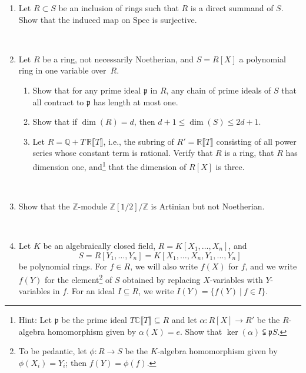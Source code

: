 \documentclass[12pt]{amsart}
\newcommand{\Q}{\mathbb{Q}}
\newcommand{\Z}{\mathbb{Z}}
\newcommand{\R}{\mathbb{R}}
\newcommand{\C}{\mathbb{C}}
\newcommand{\p}{\mathfrak{p}}
\newcommand{\Spec}{\mathrm{Spec}}
\begin{document}
\begin{enumerate}

\item Let $R\subset S$ be an inclusion of rings such that $R$ is a direct summand of $S$. Show that the induced map on $\Spec$ is surjective.

\



\item Let $R$ be a ring, not necessarily Noetherian, and $S=R[X]$ a polynomial ring in one variable over~$R$.
\begin{enumerate} 
\item Show that for any prime ideal $\p$ in $R$, any chain of prime ideals of $S$ that all contract to $\p$ has length at most one.
\item Show that if $\dim(R)=d$, then $d+1 \leq \dim(S) \leq 2d+1$.
\item Let $R= \Q + T \,\R \llbracket T \rrbracket$, i.e., the subring of $R' = \R \llbracket T \rrbracket$ consisting of all power series whose constant term is rational. Verify that $R$ is a ring, that $R$ has dimension one, and\footnote{Hint: Let $\p$ be the prime ideal $T\C \llbracket T \rrbracket\subseteq R$ and let  $\alpha:R[X]\to R'$ be the $R$-algebra homomorphism given by $\alpha(X)=e$. Show that $\ker(\alpha) \subsetneqq \p S$.} that the dimension of $R[X]$ is three.
\end{enumerate}



\



\item Show that the $\Z$-module $\Z[1/2]/\Z$ is Artinian but not Noetherian.

\


\item Let $K$ be an algebraically closed field, $R=K[X_1,\dots,X_n]$, and 
\[S=R[Y_1,\dots,Y_n]=K[X_1,\dots,X_n,Y_1,\dots,Y_n]\] be polynomial rings. For $f\in R$, we will also write $f(X)$ for $f$, and we write $f(Y)$ for the element\footnote{To be pedantic, let $\phi:R\to S$ be the $K$-algebra homomorphism given by $\phi(X_i)=Y_i$; then $f(Y)=\phi(f)$.} of $S$ obtained by replacing $X$-variables with $Y$-variables in $f$. For an ideal $I\subseteq R$, we write $I(Y) = \{ f(Y) \ | \ f\in I\}$.


\end{enumerate}
\end{document}
